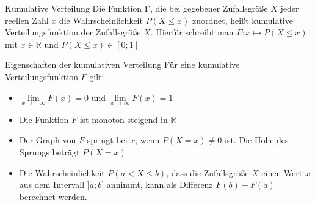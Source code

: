\begin{merke}{Kumulative Verteilung}{}
Die Funktion F, die bei gegebener Zufallsgröße \(X\) jeder reellen Zahl \(x\) die Wahrscheinlichkeit \(P(X\leq x)\) zuordnet, heißt kumulative Verteilungsfunktion der Zufallsgröße \(X\). Hierfür schreibt man \(F:x \mapsto P(X\leq x)\) mit \(x \in \mathds{R}\) und \(P(X\leq x) \in [0;1]\)
\end{merke}
\begin{b8d}{Eigenschaften der kumulativen Verteilung}{}
Für eine kumulative Verteilungsfunktion \(F\) gilt:
\begin{itemize}
    \item \(\lim\limits_{x\longrightarrow -\infty} F(x) = 0\) und \(\lim\limits_{x\longrightarrow \infty} F(x) = 1\)
    \item Die Funktion \(F\) ist monoton steigend in \(\mathds{R}\)
    \item Der Graph von \(F\) springt bei \(x\), wenn \(P(X= x) \neq 0\) ist. Die Höhe des Sprungs beträgt \(P(X=x)\)
    \item Die Wahrscheinlichkeit \(P(a<X\leq b)\), dass die Zufallsgröße \(X\) einen Wert \(x\) aus dem Intervall \(]a;b]\) annimmt, kann als Differenz \(F(b) - F(a)\) berechnet werden.
\end{itemize}
\end{b8d}
